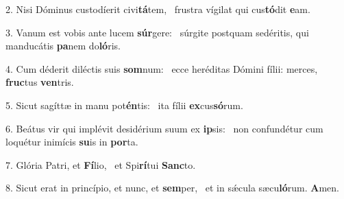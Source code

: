 2. Nisi Dóminus custodíerit civi\textbf{tá}tem, \ast\  frustra vígilat qui cus\textbf{tó}dit \textbf{e}am.\

3. Vanum est vobis ante lucem \textbf{súr}gere: \ast\  súrgite postquam sedéritis, qui manducátis \textbf{pa}nem do\textbf{ló}ris.\

4. Cum déderit diléctis suis \textbf{som}num: \ast\  ecce heréditas Dómini fílii: merces, \textbf{fruc}tus \textbf{ven}tris.\

5. Sicut sagíttæ in manu pot\textbf{én}tis: \ast\  ita fílii \textbf{ex}cus\textbf{só}rum.\

6. Beátus vir qui implévit desidérium suum ex \textbf{ip}sis: \ast\  non confundétur cum loquétur inimícis \textbf{su}is in \textbf{por}ta.\

7. Glória Patri, et \textbf{Fí}lio, \ast\  et Spi\textbf{rí}tui \textbf{Sanc}to.\

8. Sicut erat in princípio, et nunc, et \textbf{sem}per, \ast\  et in sǽcula sæcu\textbf{ló}rum. \textbf{A}men.\

